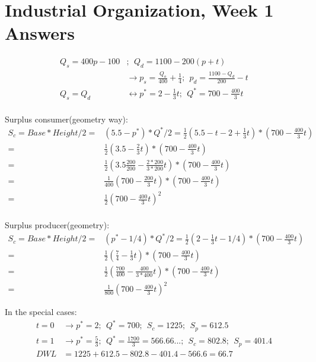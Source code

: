 \documentclass[12pt]{report}
\numberwithin{equation}{section}
\begin{document}
\section{Industrial Organization, Week 1 Answers}

\begin{align*}
Q_s = 400p-100&; ~~Q_d = 1100-200(p+t) \\
&\rightarrow 
p_s = \frac{Q_o}{400} + \frac{1}{4} ; ~~p_d = \frac{1100-Q_d}{200}-t  \\
Q_s = Q_d 
&\leftrightarrow p^* = 2 - \frac{1}{3}t; ~~ Q^*=700 - \frac{400}{3}t \\ 
\end{align*}

Surplus consumer(geometry way):
\begin{align*}
S_c = Base*Height/2 =& (5.5-p^*)*Q^*/2 =\frac{1}{2}(5.5-t-2 + \frac{1}{3}t)*(700 - \frac{400}{3}t) \\
=& \frac{1}{2}(3.5 - \frac{2}{3}t)*(700 - \frac{400}{3}t) \\
=& \frac{1}{2}(3.5 \frac{200}{200} - \frac{2*200}{3*200}t)*(700 - \frac{400}{3}t) \\
=& \frac{1}{400}(700 - \frac{200}{3}t)*(700 - \frac{400}{3}t) \\
=& \frac{1}{2}(700 - \frac{400}{3}t)^2 \\
\end{align*}




Surplus producer(geometry):
\begin{align*}
S_c = Base*Height/2 =& (p^*-1/4)*Q^*/2 = \frac{1}{2}( 2 - \frac{1}{3}t -1/4)*(700 - \frac{400}{3}t) \\
=& \frac{1}{2}( \frac{7}{4} - \frac{1}{3}t )*(700 - \frac{400}{3}t) \\
=& \frac{1}{2}( \frac{700}{400} - \frac{400}{3*400}t )*(700 - \frac{400}{3}t)  \\
=& \frac{1}{800}( 700 - \frac{400}{3}t )^2
\end{align*}

In the special cases:
\begin{align*}
t = 0 &\rightarrow p^* = 2; ~~ Q^*= 700;  ~~S_c = 1225; ~~ S_p = 612.5\\
t = 1 &\rightarrow p^* = \frac{5}{3}; ~~ Q^*= \frac{1700}{3}= 566.66...;  ~~ S_c = 802.8;  ~~  S_p = 401.4 \\
DWL &= 1225+612.5-802.8-401.4-566.6=66.7
\end{align*}
\end{document}
